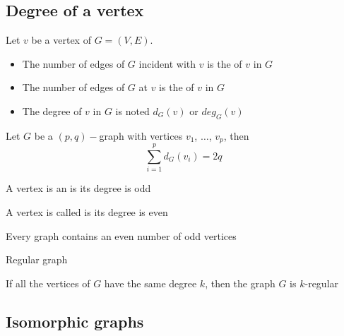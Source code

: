 \documentclass[aspectratio=43]{beamer}
\begin{document}
\subsection{Degree of a vertex}

\begin{frame}
	\begin{definition}
	Let $v$ be a vertex of $G=(V,E)$.
	\begin{itemize}
	\item The number of edges of $G$ incident with $v$ is the  of $v$ in $G$
	\item The number of edges of $G$ at $v$ is the  of $v$ in $G$
	\item The degree of $v$ in $G$ is noted $d_G(v)$ or $deg_G(v)$
	\end{itemize}
	\end{definition}
	\vfill
	\begin{theorem}
	Let $G$ be a $(p,q)-$graph with vertices $v_1$, $\dots$, $v_p$, then
	\[
		\sum_{i=1}^{p}d_G(v_i)=2q
	\]
	\end{theorem}
\end{frame}

\begin{frame}
\begin{definition}
A vertex is an  is its degree is odd
\end{definition}
\vfill
\begin{definition}
A vertex is called  is its degree is even
\end{definition}
\vfill
\begin{theorem}
Every graph contains an even number of odd vertices
\end{theorem}
\end{frame}

\begin{frame}{Regular graph}
\begin{definition}
	If all the vertices of $G$ have the same degree $k$, then the graph $G$ is $k$-regular
\end{definition}
\end{frame}




\subsection{Isomorphic graphs}
\end{document}
